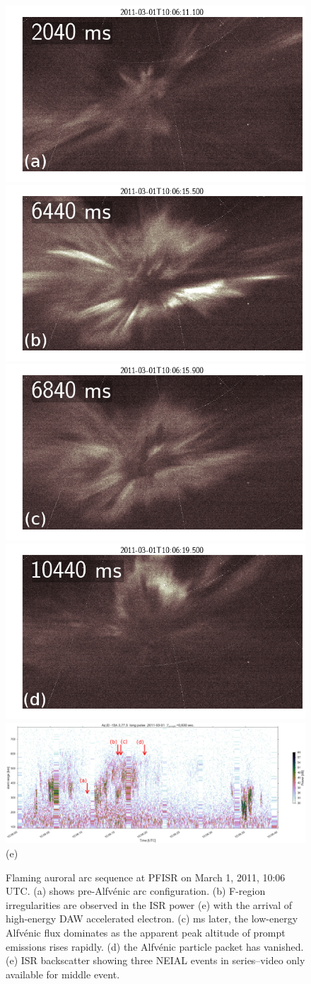 \begin{figure}\centering
    \includegraphics[width=0.19\columnwidth,trim=30 0 200 0,clip]{gfx/2011-03-01/2040}
    \includegraphics[width=0.261\columnwidth,trim=30 0 60 0,clip]{gfx/2011-03-01/6440}
    \includegraphics[width=0.261\columnwidth,trim=30 0 60 0,clip]{gfx/2011-03-01/6840}
    \includegraphics[width=0.261\columnwidth,trim=30 0 60 0,clip]{gfx/2011-03-01/10440}
    \includegraphics[width=\columnwidth,trim=0 50 0 0]{gfx/2011-03-01/power_longpulse2011-03-0110-06-00}\\
    {\large(e)}
    \vspace{0.1cm}

    \caption{Flaming auroral arc sequence at PFISR on March 1, 2011, 10:06 UTC.
        (a) shows pre-Alfvénic arc configuration.
        (b) F-region irregularities are observed in the ISR power (e) with the arrival of high-energy DAW accelerated electron.
        (c) \unit[400]{ms} later, the low-energy Alfvénic flux dominates as the apparent peak altitude of prompt emissions rises rapidly.
        (d) the Alfvénic particle packet has vanished.
        (e) ISR backscatter showing three NEIAL events in series--video only available for middle event.}
    \label{fig:20110301a}
\end{figure}


